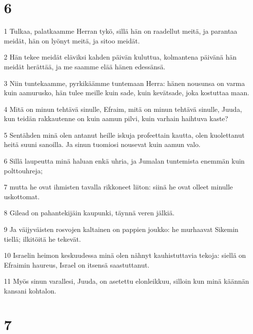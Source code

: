 \chapter{6}

\par 1 Tulkaa, palatkaamme Herran tykö, sillä hän on raadellut meitä, ja parantaa meidät, hän on lyönyt meitä, ja sitoo meidät.
\par 2 Hän tekee meidät eläviksi kahden päivän kuluttua, kolmantena päivänä hän meidät herättää, ja me saamme elää hänen edessänsä.
\par 3 Niin tuntekaamme, pyrkikäämme tuntemaan Herra: hänen nousunsa on varma kuin aamurusko, hän tulee meille kuin sade, kuin kevätsade, joka kostuttaa maan.
\par 4 Mitä on minun tehtävä sinulle, Efraim, mitä on minun tehtävä sinulle, Juuda, kun teidän rakkautenne on kuin aamun pilvi, kuin varhain haihtuva kaste?
\par 5 Sentähden minä olen antanut heille iskuja profeettain kautta, olen kuolettanut heitä suuni sanoilla. Ja sinun tuomiosi nousevat kuin aamun valo.
\par 6 Sillä laupeutta minä haluan enkä uhria, ja Jumalan tuntemista enemmän kuin polttouhreja;
\par 7 mutta he ovat ihmisten tavalla rikkoneet liiton: siinä he ovat olleet minulle uskottomat.
\par 8 Gilead on pahantekijäin kaupunki, täynnä veren jälkiä.
\par 9 Ja väijyväisten rosvojen kaltainen on pappien joukko: he murhaavat Sikemin tiellä; ilkitöitä he tekevät.
\par 10 Israelin heimon keskuudessa minä olen nähnyt kauhistuttavia tekoja: siellä on Efraimin haureus, Israel on itsensä saastuttanut.
\par 11 Myös sinun varallesi, Juuda, on asetettu elonleikkuu, silloin kun minä käännän kansani kohtalon.

\chapter{7}

